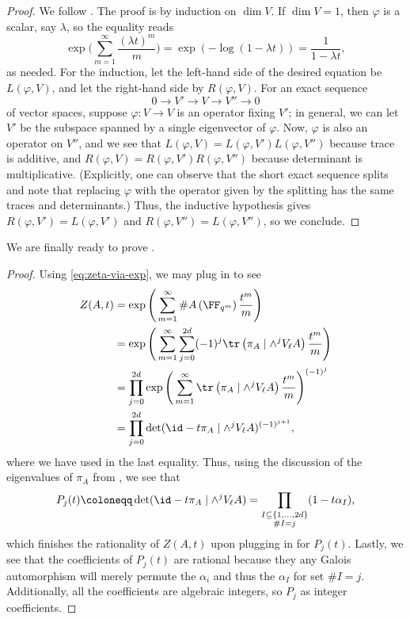 \documentclass{amsart}
\begin{document}
\begin{proof}
	We follow \cite[Lemma~C.4.1]{hartshorne}. The proof is by induction on $\dim V$. If $\dim V=1$, then $\varphi$ is a scalar, say $\lambda$, so the equality reads
	\[\exp\Bigg(\sum_{m=1}^\infty\frac{(\lambda t)^m}m\Bigg)=\exp(-\log(1-\lambda t))=\frac1{1-\lambda t},\]
	as needed. For the induction, let the left-hand side of the desired equation be $L(\varphi,V)$, and let the right-hand side by $R(\varphi,V)$. For an exact sequence
	\[0\to V'\to V\to V''\to0\]
	of vector spaces, suppose $\varphi\colon V\to V$ is an operator fixing $V'$; in general, we can let $V'$ be the subspace spanned by a single eigenvector of $\varphi$. Now, $\varphi$ is also an operator on $V''$, and we see that $L(\varphi,V)=L(\varphi,V')L(\varphi,V'')$ because trace is additive, and $R(\varphi,V)=R(\varphi,V')R(\varphi,V'')$ because determinant is multiplicative. (Explicitly, one can observe that the short exact sequence splits and note that replacing $\varphi$ with the operator given by the splitting has the same traces and determinants.) Thus, the inductive hypothesis gives $R(\varphi,V')=L(\varphi,V')$ and $R(\varphi,V'')=L(\varphi,V'')$, so we conclude.
\end{proof}
We are finally ready to prove .
\ratforabvar*
\begin{proof}
	Using \eqref{eq:zeta-via-exp}, we may plug in  to see
	\begin{align*}
		Z(A,t) &= \exp\Bigg(\sum_{m=1}^\infty\#A\left(\FF_{q^m}\right)\frac{t^m}m\Bigg) \\
		&= \exp\Bigg(\sum_{m=1}^\infty\sum_{j=0}^{2d}(-1)^j\tr\left(\pi_A\mid\wedge^jV_\ell A\right)\frac{t^m}m\Bigg) \\
		&= \prod_{j=0}^{2d}\exp\Bigg(\sum_{m=1}^\infty\tr\left(\pi_A\mid\wedge^jV_\ell A\right)\frac{t^m}m\Bigg)^{(-1)^j} \\
		&= \prod_{j=0}^{2d}\det({\id}-t\pi_A\mid\wedge^jV_\ell A)^{(-1)^{j+1}},
	\end{align*}
	where we have used  in the last equality. Thus, using the discussion of the eigenvalues of $\pi_A$ from , we see that
	\[P_j(t)\coloneqq\det({\id}-t\pi_A\mid\wedge^jV_\ell A)=\prod_{\substack{I\subseteq\{1,\ldots,2d\}\\\#I=j}}(1-t\alpha_I),\]
	which finishes the rationality of $Z(A,t)$ upon plugging in for $P_j(t)$. Lastly, we see that the coefficients of $P_j(t)$ are rational because they any Galois automorphism will merely permute the $\alpha_i$ and thus the $\alpha_I$ for set $\#I=j$. Additionally, all the coefficients are algebraic integers, so $P_j$ as integer coefficients.
\end{proof}
\end{document}
